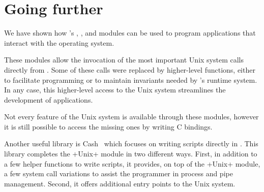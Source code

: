 %
%

\chapter*{\label{sec/more}Going further}

We have shown how \ocaml's , , and
 modules can be used to program applications that
interact with the operating system.

These modules allow the invocation of the most important Unix system calls
directly from {\ocaml}. Some of these calls were replaced by higher-level
functions, either to facilitate programming or to maintain invariants
needed by {\ocaml}'s runtime system. In any case, this higher-level
access to the Unix system streamlines the development of applications.

Not every feature of the Unix system is available through these
modules, however it is still possible to access the missing ones by
writing C bindings.

Another useful library is Cash~\cite{Cash} which focuses on writing
scripts directly in {\ocaml}. This library completes the \ml+Unix+
module in two different ways. First, in addition to a few helper
functions to write scripts, it provides, on top of the \ml+Unix+
module, a few system call variations to assist the programmer in
process and pipe management. Second, it offers additional entry points
to the Unix system.
